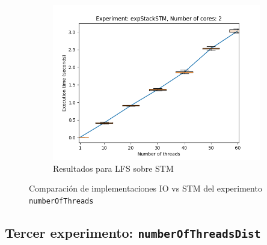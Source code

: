 \begin{figure}[H]
\begin{subfigure}[b]{0.49\textwidth}
        \includegraphics[width=\textwidth]{images/numberOfThreads/plots/expStackSTM-2}
        \caption{Resultados para LFS sobre STM}
        \label{subfig:numberOfThreads-stackstm-2}
    \end{subfigure}
    \caption{Comparación de implementaciones IO vs STM del experimento \texttt{numberOfThreads}}
    \label{fig:numberOfThreads-boxplots}
\end{figure}

\subsection{Tercer experimento: \texttt{numberOfThreadsDist}}




